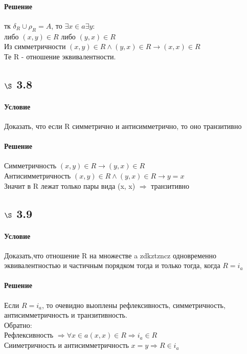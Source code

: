 \documentclass[a4paper,12pt]{article}
\begin{document}
\paragraph*{Решение}
тк $\delta_R\cup\rho_R = A$, то $\exists x \in a \exists y:$\\
либо $(x, y) \in R$ либо $(y, x) \in R$ \\
Из симметричности $(x, y) \in R \wedge (y, x) \in R \rightarrow (x, x) \in R$\\
Те R - отношение эквивалентности.

\subsection*{$\S$ 3.8}
\paragraph*{Условие}
Доказать, что если R симметрично и антисимметрично, то оно транзитивно
\paragraph*{Решение}
Симметричность $(x, y) \in R \rightarrow (y, x) \in R$\\
Антисимметричность $(x, y) \in R \wedge (y, x) \in R \rightarrow y = x$\\
Значит в R лежат только пары вида (x, x) $\Rightarrow$ транзитивно

\subsection*{$\S$ 3.9}
\paragraph*{Условие}
Доказать,что отношение R на множестве a zdkztzncz одновременно эквивалентностью и частичным порядком тогда и только тогда, когда $ R = i_a$
\paragraph*{Решение}
Если $ R = i_a$, то очевидно выоплены рефлексивность, симметричность, антисимметричность и транзитивность.\\
Обратно:\\
Рефлексивность $\Rightarrow \forall x \in a (x, x) \in R \Rightarrow i_a \in R$\\
Сииметричность и антисимметричность $ x = y \Rightarrow R \in  i_a $
\end{document}
